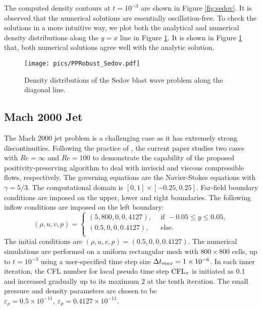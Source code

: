The computed density contours at $t=10^{-3}$ are shown in Figure \ref{fig:sedov}. It is observed that the numerical solutions are essentially oscillation-free. To check the solutions in a more intuitive way, we plot both the analytical and numerical density distributions along the $y=x$ line in Figure \ref{fig:sedovLine}.
It is shown in Figure \ref{fig:sedovLine} that, both numerical solutions agree well with the analytic solution.

\begin{figure}[htbp]
    \centering
    \texttt{[image: pics/PPRobust\_Sedov.pdf]}
    \caption{Density distributions of the Sedov blast wave problem along the diagonal line.}
    \label{fig:sedovLine}
\end{figure}






\subsection{Mach 2000 Jet}

The Mach 2000 jet problem \cite{zhang2010positivity} is a challenging case as it has extremely strong discontinuities.
Following the practice of \cite{huang2024general},
the current paper studies two cases with $Re=\infty$ and $Re=100$ to demonstrate the capability of the proposed positivity-preserving algorithm to deal with inviscid and viscous compressible flows, respectively.
The governing equations are the Navier-Stokes equations with $\gamma=5/3$.
The computational domain is $[0,1]\times[-0.25,0.25]$.
Far-field boundary conditions are imposed on the upper, lower and right boundaries. The following inflow conditions are imposed on the left boundary:
\begin{equation}
    (\rho,u,v,p) = \left\{
    \begin{array}{ll}
        (5,800,0,0,4127),\ \  & \text{if } -0.05 \leq y \leq 0.05, \\
        (0.5,0,0,0.4127),\ \  & \text{else}.                       \\
    \end{array}
    \right.
\end{equation}
The initial conditions are $(\rho,u,v,p)=(0.5,0,0,0.4127)$.
The numerical simulations are performed on a uniform rectangular mesh with $800 \times 800$ cells, up to $t=10^{-3}$ using a user-specified time step size $\mathrm\Delta t_{max} = 1\times10^{-6}$.
In each inner iteration, the CFL number for local pseudo time step $\text{CFL}_\tau$ is initiated as $0.1$
and increased gradually up to its maximum $2$ at the tenth iteration.
The small pressure and density parameters are chosen to be
$\varepsilon_\rho = 0.5\times10^{-11},\ \varepsilon_p = 0.4127\times10^{-11}$.

